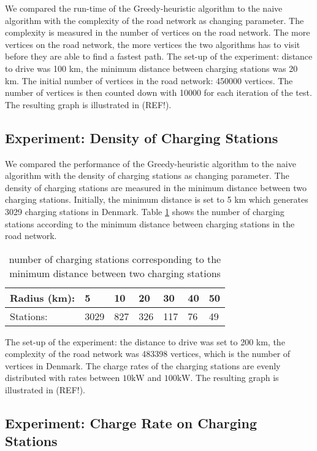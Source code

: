 We compared the run-time of the Greedy-heuristic algorithm to the naive algorithm with the complexity of the road network as changing parameter. The
complexity is measured in the number of vertices on the road network. The more vertices on the road network, the more vertices the two algorithms has 
to visit before they are able to find a fastest path. The set-up of the experiment: distance to drive was 100 km, the minimum distance between 
charging stations was 20 km. The initial number of vertices in the road network: 450000 vertices. The number of vertices is then counted down with 10000 for each iteration of the test. The resulting graph is illustrated in (REF!).

\subsection{Experiment: Density of Charging Stations}

We compared the performance of the Greedy-heuristic algorithm to the naive algorithm with the density of charging stations as changing parameter. The
density of charging stations are measured in the minimum distance between two charging stations. Initially, the minimum distance is set to 5 km which generates 3029 charging stations in Denmark. Table \ref{table:chargedensity} shows the number of charging stations according to the minimum distance between charging stations in the road network.

\begin{table}[!htb]
\centering
		\begin{tabular}{ p{1.85cm} p{0.67cm} p{0.63cm} p{0.63cm} p{0.63cm} p{0.63cm} p{0.63cm} } \hline
		Radius (km): & 5 & 10 & 20 & 30 & 40 & 50 \\ \hline
		Stations: & 3029 & 827 & 326 & 117 & 76 & 49 \\ \hline 
		\end{tabular}
		\caption{number of charging stations corresponding to the minimum distance between two charging stations}
	\label{table:chargedensity}
	\end{table}

The set-up of the experiment: the distance to drive was set to 200 km, the complexity of the road network was 483398 vertices, which is the number of vertices in Denmark. The charge rates of the charging stations are evenly distributed with rates between $10 \si{\kW}$ and $100 \si{\kW}$. The resulting graph is illustrated in (REF!).

\subsection{Experiment: Charge Rate on Charging Stations}

